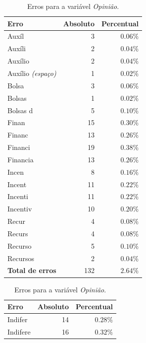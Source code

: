 \documentclass[10pt,a4paper,oneside]{article}
\begin{document}
\begin{table}[!h]
\centering
\begin{minipage}[t]{0.49\textwidth}
\caption{Erros para a variável \textit{Pagamento}.}
\vspace{0.5em}
\label{table: erros-pagamento}
\begin{tabular}{l r r}
	\toprule
	\textbf{Erro} & \textbf{Absoluto}  & \textbf{Percentual} \\
	\midrule
	Auxíl     		& 3   & $0.06\%$ \\
	Auxíli 	  		& 2   & $0.04\%$ \\
	Auxílio    	 	& 2   & $0.04\%$ \\
	Auxílio \textit{(espaço)}   	& 1   & $0.02\%$ \\
	Bolsa      	 	& 3   & $0.06\%$ \\
	Bolsas     	 	& 1   & $0.02\%$ \\
	Bolsas d   	 	& 5   & $0.10\%$ \\
	Finan      	 	& 15  & $0.30\%$ \\
	Financ     	 	& 13  & $0.26\%$ \\
	Financi    	 	& 19  & $0.38\%$ \\
	Financia   	 	& 13  & $0.26\%$ \\
	Incen      	 	& 8   & $0.16\%$ \\
	Incent     	 	& 11  & $0.22\%$ \\
	Incenti    	 	& 11  & $0.22\%$ \\
	Incentiv   	 	& 10  & $0.20\%$ \\
	Recur      	 	& 4   & $0.08\%$ \\
	Recurs     	 	& 4   & $0.08\%$ \\
	Recurso    	 	& 5   & $0.10\%$ \\
	Recursos   	 	& 2   & $0.04\%$ \\	
	\midrule
	\textbf{Total de erros}  & 132  & $2.64\%$ \\	
	\bottomrule
\end{tabular}
\end{minipage}
%
\begin{minipage}[t]{0.49\textwidth}
\caption{Erros para a variável \textit{Opinião}.}
\vspace{0.5em}
\label{table: erros-opiniao}
\begin{tabular}{l r r}
	\toprule
	\textbf{Erro} & \textbf{Absoluto}  & \textbf{Percentual} \\
	\midrule
	Indifer    & 14  & $0.28\%$ \\
	Indifere   & 16  & $0.32\%$ \\

\end{tabular}
\end{minipage}
\end{table}
\end{document}
